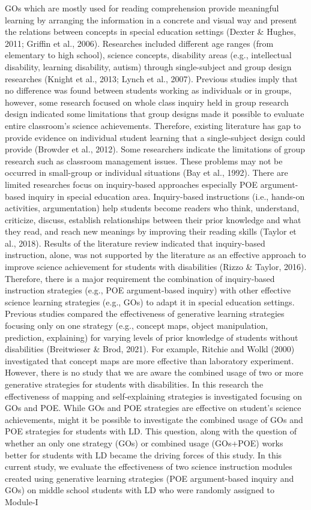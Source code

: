 \documentclass[11.5pt]{sig-alternate} %
\begin{document}
\begin{large}
GOs which are mostly used for reading comprehension provide meaningful learning by arranging the information in a concrete and visual way and present the relations between concepts in special education settings (Dexter \& Hughes, 2011; Griffin et al., 2006). Researches included different age ranges (from elementary to high school), science concepts, disability areas (e.g., intellectual disability, learning disability, autism) through single-subject and group design researches (Knight et al., 2013; Lynch et al., 2007). Previous studies imply that no difference was found between students working as individuals or in groups, however, some research focused on whole class inquiry held in group research design indicated some limitations that group designs made it possible to evaluate entire classroom’s science achievements. Therefore, existing literature has gap to provide evidence on individual student learning that a single-subject design could provide (Browder et al., 2012). Some researchers indicate the limitations of group research such as classroom management issues. These problems may not be occurred in small-group or individual situations (Bay et al., 1992). There are limited researches focus on inquiry-based approaches especially POE argument-based inquiry in special education area. Inquiry-based instructions (i.e., hands-on activities, argumentation) help students become readers who think, understand, criticize, discuss, establish relationships between their prior knowledge and what they read, and reach new meanings by improving their reading skills (Taylor et al., 2018). Results of the literature review indicated that inquiry-based instruction, alone, was not supported by the literature as an effective approach to improve science achievement for students with disabilities (Rizzo \& Taylor, 2016). Therefore, there is a major requirement the combination of inquiry-based instruction strategies (e.g., POE argument-based inquiry) with other effective science learning strategies (e.g., GOs) to adapt it in special education settings. Previous studies compared the effectiveness of generative learning strategies focusing only on one strategy (e.g., concept maps, object manipulation, prediction, explaining) for varying levels of prior knowledge of students without disabilities (Breitwieser \& Brod, 2021). For example, Ritchie and Wolkl (2000) investigated that concept maps are more effective than laboratory experiment. However, there is no study that we are aware the combined usage of two or more generative strategies for students with disabilities. In this research the effectiveness of mapping and self-explaining strategies is investigated focusing on GOs and POE. While GOs and POE strategies are effective on student’s science achievements, might it be possible to investigate the combined usage of GOs and POE strategies for students with LD. This question, along with the question of whether an only one strategy (GOs) or combined usage (GOs+POE) works better for students with LD became the driving forces of this study. In this current study, we evaluate the effectiveness of two science instruction modules created using generative learning strategies (POE argument-based inquiry and GOs) on middle school students with LD who were randomly assigned to Module-I 
\end{large}
\end{document}
